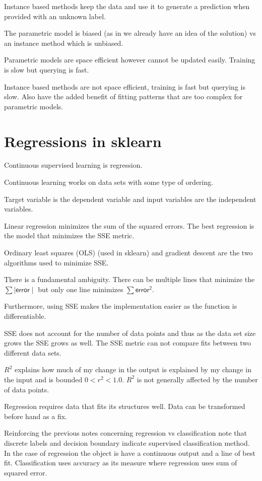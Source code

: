 \documentclass{article}
\begin{document}
Instance based methods keep the data and use it to generate a
prediction when provided with an unknown label.

The parametric model is biased (as in we already have an idea of the solution)
vs an instance method which is unbiased.

Parametric models are space efficient however cannot be updated easily. Training
is slow but querying is fast.

Instance based methods are not space efficient, training is fast but querying is
slow. Also have the added benefit of fitting patterns that are too complex for
parametric models.

\section{Regressions in sklearn}

Continuous supervised learning is regression.

Continuous learning works on data sets with some type of ordering.

Target variable is the dependent variable and input variables are the
independent variables.

Linear regression minimizes the sum of the squared errors. The best regression
is the model that minimizes the SSE metric.

Ordinary least squares (OLS) (used in sklearn) and gradient descent are the
two algorithms used to minimize SSE.

There is a fundamental ambiguity. There can be multiple lines that minimize the
$\sum \mid \textsf{error} \mid$ but only one line minimizes
$\sum \textsf{error}^2$.

Furthermore, using SSE makes the implementation easier as the function is
differentiable.

SSE does not account for the number of data points and thus as the data set
size grows the SSE grows as well. The SSE metric can not compare fits between
two different data sets.

$R^2$ explains how much of my change in the output is explained by my change
in the input and is bounded $0 < r^2 < 1.0$. $R^2$ is not generally affected
by the number of data points.

Regression requires data that fits its structures well. Data can be transformed
before hand as a fix.

Reinforcing the previous notes concerning regression vs classification note that
discrete labels and decision boundary indicate supervised classification method.
In the case of regression the object is have a continuous output and a line of
best fit. Classification uses accuracy as its measure where regression uses
sum of squared error.
\end{document}
